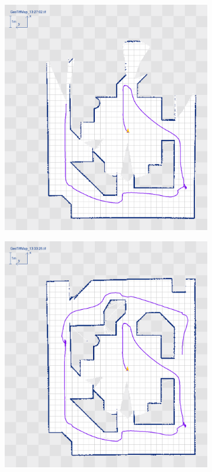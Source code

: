 \documentclass[a4paper]{article}
\begin{document}
\begin{figure}[h!]
\begin{subfigure}[b]{0.4\textwidth}
  \end{subfigure}
  \begin{subfigure}[b]{0.4\textwidth}
    \includegraphics[width=\textwidth,height=\textheight,keepaspectratio]{img/move_square/4.png}
  \end{subfigure}
  \begin{subfigure}[b]{0.4\textwidth}
    \includegraphics[width=\textwidth,height=\textheight,keepaspectratio]{img/move_square/5.png}

\end{subfigure}
\end{figure}
\end{document}
